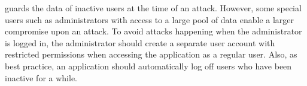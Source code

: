 \name{} guards the data of inactive users at the time of an
attack. However, some special users such as administrators with access
to a large pool of data enable a larger compromise upon an attack.  To
avoid attacks happening when the administrator is logged in, the
administrator should create a separate user account with restricted
permissions when accessing the application as a regular user. Also, as
best practice, an application should automatically log off users who
have been inactive for a while.










